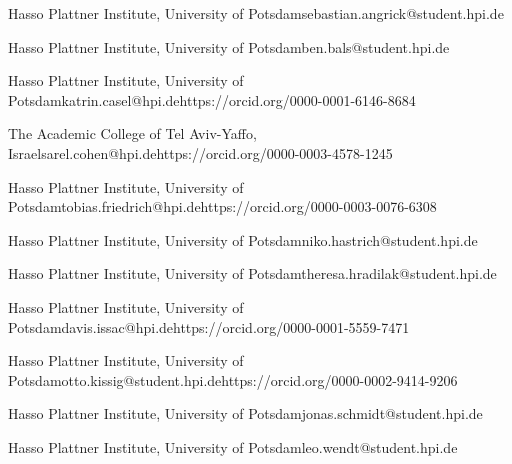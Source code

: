 \usepackage{amsmath}
\usepackage{amssymb}
\usepackage{mathtools}
\usepackage{todonotes}


\graphicspath{{img/}}%


\author{Sebastian Angrick}{Hasso Plattner Institute, University of Potsdam}{sebastian.angrick@student.hpi.de}{}{}
\author{Ben Bals}{Hasso Plattner Institute, University of Potsdam}{ben.bals@student.hpi.de}{}{}
\author{Katrin Casel}{Hasso Plattner Institute, University of Potsdam}{katrin.casel@hpi.de}{https://orcid.org/0000-0001-6146-8684}{}
\author{Sarel Cohen}{The Academic College of Tel Aviv-Yaffo, Israel}{sarel.cohen@hpi.de}{https://orcid.org/0000-0003-4578-1245}{}
\author{Tobias Friedrich}{Hasso Plattner Institute, University of Potsdam}{tobias.friedrich@hpi.de}{https://orcid.org/0000-0003-0076-6308}{}
\author{Niko Hastrich}{Hasso Plattner Institute, University of Potsdam}{niko.hastrich@student.hpi.de}{}{}
\author{Theresa Hradilak}{Hasso Plattner Institute, University of Potsdam}{theresa.hradilak@student.hpi.de}{}{}
\author{Davis Issac}{Hasso Plattner Institute, University of Potsdam}{davis.issac@hpi.de}{https://orcid.org/0000-0001-5559-7471}{}
\author{Otto Kißig}{Hasso Plattner Institute, University of Potsdam}{otto.kissig@student.hpi.de}{https://orcid.org/0000-0002-9414-9206}{}
\author{Jonas Schmidt}{Hasso Plattner Institute, University of Potsdam}{jonas.schmidt@student.hpi.de}{}{}
\author{Leo Wendt}{Hasso Plattner Institute, University of Potsdam}{leo.wendt@student.hpi.de}{}{}





